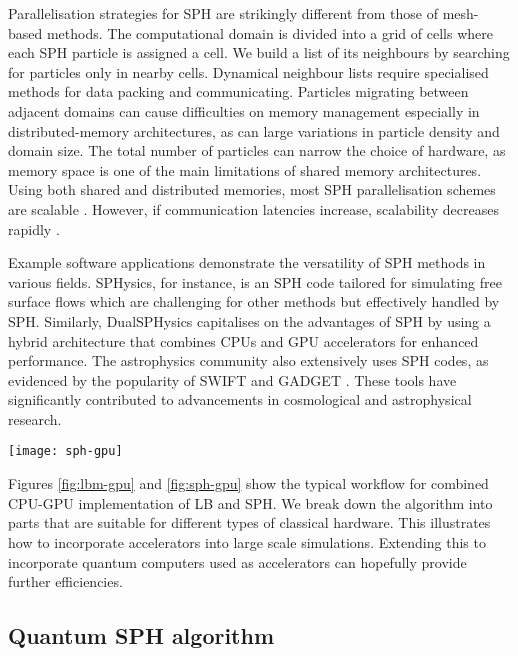 \documentclass[10pt]{iopart}
\begin{document}
Parallelisation strategies for SPH are strikingly different from those of mesh-based methods. The computational domain is divided into a grid of cells where each SPH particle is assigned a cell. We build a list of its neighbours by searching for particles only in nearby cells. Dynamical neighbour lists require specialised methods for data packing and communicating. Particles migrating between adjacent domains can cause difficulties on memory management especially in distributed-memory architectures, as can large variations in particle density and domain size. The total number of particles can narrow the choice of hardware, as memory space is one of the main limitations of shared memory architectures. Using both shared and distributed memories, most SPH parallelisation schemes are scalable \cite{Ferrari2009,Dominguez2013}. However, if communication latencies increase, scalability decreases rapidly \cite{Oger2016}.

Example software applications demonstrate the versatility of SPH methods in various fields. SPHysics, for instance, is an SPH code tailored for simulating free surface flows which are challenging for other methods but effectively handled by SPH. Similarly, DualSPHysics \cite{Dominguez2022} capitalises on the advantages of SPH by using a hybrid architecture that combines CPUs and GPU accelerators for enhanced performance. The astrophysics community also extensively uses SPH codes, as evidenced by the popularity of SWIFT \cite{schaller2023swift} and GADGET \cite{springel2005cosmological}. These tools have significantly contributed to advancements in cosmological and astrophysical research.

\begin{figure*}[ht!]
\centering
\texttt{[image: sph-gpu]}
\caption{Sketch of parallelised SPH numerical process with CPU and GPU.}
\label{fig:sph-gpu}
\end{figure*}

Figures \ref{fig:lbm-gpu} and \ref{fig:sph-gpu} show the typical workflow for combined CPU-GPU implementation of LB and SPH. We break down the algorithm into parts that are suitable for different types of classical hardware. This illustrates how to incorporate accelerators into large scale simulations. Extending this to incorporate quantum computers used as accelerators can hopefully provide further efficiencies.


\subsection{Quantum SPH algorithm}
\end{document}
